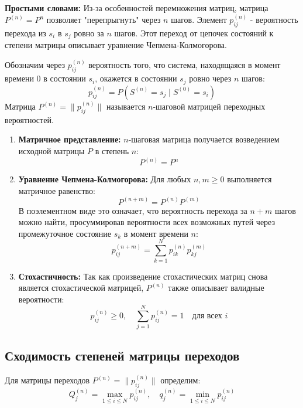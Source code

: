 \begin{commentary}
    \textbf{Простыми словами:} Из-за особенностей перемножения матриц, матрица $P^{(n)} = P^n$ позволяет "перепрыгнуть" через $n$ шагов. Элемент $p_{ij}^{(n)}$ - вероятность перехода из $s_i$ в $s_j$ ровно за $n$ шагов.
    Этот переход от цепочек состояний к степени матрицы описывает уравнение Чепмена-Колмогорова. 
\end{commentary}

\begin{definition}
Обозначим через $p_{ij}^{(n)}$ вероятность того, что система, находящаяся в момент времени $0$ в состоянии $s_i$, окажется в состоянии $s_j$ ровно через $n$ шагов:
$$ p_{ij}^{(n)} = P(S^{(n)} = s_j \mid S^{(0)} = s_i) $$
Матрица $P^{(n)} = \|p_{ij}^{(n)}\|$ называется $n$-шаговой матрицей переходных вероятностей.
\end{definition}

\begin{statement}
\leavevmode
\begin{enumerate}
    \item \textbf{Матричное представление:} $n$-шаговая матрица получается возведением исходной матрицы $P$ в степень $n$:
    $$ P^{(n)} = P^n $$
    \item \textbf{Уравнение Чепмена-Колмогорова:} Для любых $n, m \ge 0$ выполняется матричное равенство:
    $$ P^{(n+m)} = P^{(n)} P^{(m)} $$
    В поэлементном виде это означает, что вероятность перехода за $n+m$ шагов можно найти, просуммировав вероятности всех возможных путей через промежуточное состояние $s_k$ в момент времени $n$:
    $$ p_{ij}^{(n+m)} = \sum_{k=1}^{N} p_{ik}^{(n)} p_{kj}^{(m)} $$
    \item \textbf{Стохастичность:} Так как произведение стохастических матриц снова является стохастической матрицей, $P^{(n)}$ также описывает валидные вероятности:
    $$ p_{ij}^{(n)} \ge 0, \quad \sum_{j=1}^{N} p_{ij}^{(n)} = 1 \quad \text{для всех } i $$
\end{enumerate}
\end{statement}

\subsection{Сходимость степеней матрицы переходов}

\begin{definition}
Для матрицы переходов $P^{(n)} = \|p_{ij}^{(n)}\|$ определим:
$$ Q_j^{(n)} = \max_{1 \le i \le N} p_{ij}^{(n)}, \quad q_j^{(n)} = \min_{1 \le i \le N} p_{ij}^{(n)} $$
\end{definition}

